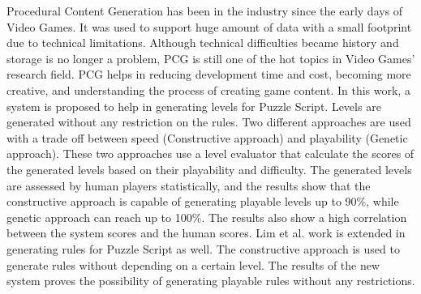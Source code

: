 Procedural Content Generation has been in the industry since the early days of Video Games. It was used to support huge amount of data with a small footprint due to technical limitations. Although technical difficulties became history and storage is no longer a problem, PCG is still one of the hot topics in Video Games' research field. PCG helps in reducing development time and cost, becoming more creative, and understanding the process of creating game content. In this work, a system is proposed to help in generating levels for Puzzle Script. Levels are generated without any restriction on the rules. Two different approaches are used with a trade off between speed (Constructive approach) and playability (Genetic approach). These two approaches use a level evaluator that calculate the scores of the generated levels based on their playability and difficulty. The generated levels are assessed by human players statistically, and the results show that the constructive approach is capable of generating playable levels up to 90\%, while genetic approach can reach up to 100\%. The results also show a high correlation between the system scores and the human scores. Lim et al. work is extended in generating rules for Puzzle Script as well. The constructive approach is used to generate rules without depending on a certain level. The results of the new system proves the possibility of generating playable rules without any restrictions.